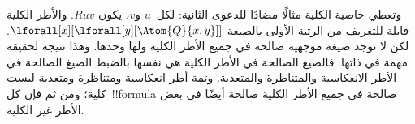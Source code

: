 \documentclass[../../../include/open-logic-section]{subfiles}
\begin{document}
وتعطي خاصية الكلية مثالًا مضادًا للدعوى الثانية: لكل~$u$ و$v$، يكون
$Ruv$. والأطر الكلية قابلة للتعريف من الرتبة الأولى بالصيغة
$\lforall[x][\lforall[y][\Atom{Q}{x,y}]]$. لكن لا توجد صيغة موجهية
صالحة في جميع الأطر الكلية ولها وحدها. وهذا نتيجة لحقيقة مهمة في
ذاتها: فالصيغ الصالحة في الأطر الكلية هي نفسها بالضبط
الصيغ الصالحة في الأطر الانعكاسية والمتناظرة والمتعدية. وثمة
أطر انعكاسية ومتناظرة ومتعدية ليست كلية؛ ومن ثم فإن كل~!!{formula}
صالحة في جميع الأطر الكلية صالحة أيضًا في بعض الأطر غير الكلية.
\end{document}
